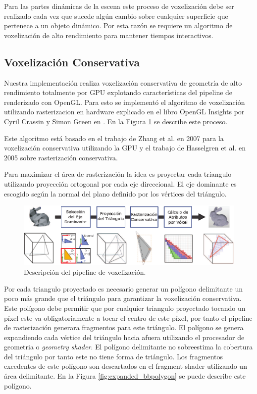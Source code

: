 Para las partes dinámicas de la escena este proceso de voxelización debe ser realizado cada vez que sucede algún cambio sobre cualquier superficie que pertenece a un objeto dinámico. Por esta razón se requiere un algoritmo de voxelización de alto rendimiento para mantener tiempos interactivos.

\subsection{Voxelización Conservativa} %
\label{sub:voxelizacion_conservativa}
Nuestra implementación realiza voxelización conservativa de geometría de alto rendimiento totalmente por \ac{GPU} explotando características del pipeline de renderizado con OpenGL. Para esto se implementó el algoritmo de voxelización utilizando rasterizacion en hardware explicado en el libro OpenGL Insights por Cyril Crassin y Simon Green en  \cite{CozziRiccio12}. En la Figura \ref{fig:vox_pipeline} se describe este proceso. 

Este algoritmo está basado en el trabajo de Zhang et al. en 2007 \cite{zhang2007conservative} para la voxelización conservativa utilizando la \ac{GPU} y el trabajo de Hasselgren et al. en 2005 \cite{hasselgren2005conservative} sobre rasterización conservativa.

Para maximizar el área de rasterización la idea es proyectar cada triangulo utilizando proyección ortogonal por cada eje direccional. El eje dominante es escogido según la normal del plano definido por los vértices del triángulo.

\begin{figure}[H]
	\centering
	\captionsetup{justification=centering}
	\includegraphics[width=\linewidth]{media/voxelization_pipeline.eps}
	\caption{Descripción del pipeline de voxelización.}
	\label{fig:vox_pipeline}
\end{figure}
 
Por cada triangulo proyectado es necesario generar un polígono delimitante un poco más grande que el triángulo para garantizar la voxelización conservativa. Este polígono debe permitir que por cualquier triangulo proyectado tocando un píxel este va obligatoriamente a tocar el centro de este píxel, por tanto el pipeline de rasterización generara fragmentos para este triángulo. El polígono se genera expandiendo cada vértice del triángulo hacia afuera utilizando el procesador de geometria o \emph{geometry shader}. El polígono delimitante no sobreestima la cobertura del triángulo por tanto este no tiene forma de triángulo. Los fragmentos excedentes de este polígono son descartados en el fragment shader utilizando un  área delimitante. En la Figura \ref{fig:expanded_bbpolygon} se puede describe este polígono.

